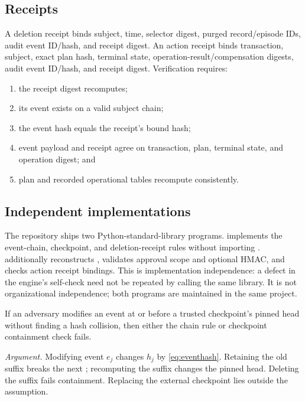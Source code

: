 \subsection{Receipts}

A deletion receipt binds subject, time, selector digest, purged record/episode IDs, audit event ID/hash, and receipt digest. An action receipt binds transaction, subject, exact plan hash, terminal state, operation-result/compensation digests, audit event ID/hash, and receipt digest. Verification requires:

\begin{enumerate}
  \item the receipt digest recomputes;
  \item its event exists on a valid subject chain;
  \item the event hash equals the receipt's bound hash;
  \item event payload and receipt agree on transaction, plan, terminal state, and operation digest; and
  \item plan and recorded operational tables recompute consistently.
\end{enumerate}



\subsection{Independent implementations}

The repository ships two Python-standard-library programs.  implements the event-chain, checkpoint, and deletion-receipt rules without importing \system.  additionally reconstructs \worldpatch, validates approval scope and optional HMAC, and checks action receipt bindings. This is implementation independence: a defect in the engine's self-check need not be repeated by calling the same library. It is not organizational independence; both programs are maintained in the same project.

 If an adversary modifies an event at or before a trusted checkpoint's pinned head without finding a hash collision, then either the chain rule or checkpoint containment check fails.

\emph{Argument.} Modifying event $e_j$ changes $h_j$ by \cref{eq:eventhash}. Retaining the old suffix breaks the next ; recomputing the suffix changes the pinned head. Deleting the suffix fails containment. Replacing the external checkpoint lies outside the assumption.

